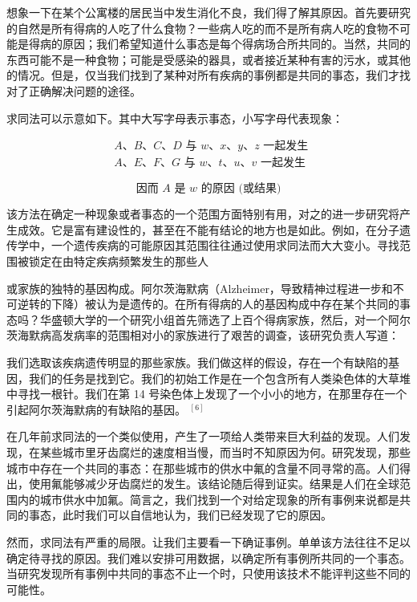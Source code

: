 想象一下在某个公寓楼的居民当中发生消化不良，我们得了解其原因。首先要研究的自然是所有得病的人吃了什么食物？一些病人吃的而不是所有病人吃的食物不可能是得病的原因；我们希望知道什么事态是每个得病场合所共同的。当然，共同的东西可能不是一种食物；可能是受感染的器具，或者接近某种有害的污水，或其他的情况。但是，仅当我们找到了某种对所有疾病的事例都是共同的事态，我们才找对了正确解决问题的途径。

求同法可以示意如下。其中大写字母表示事态，小写字母代表现象：

$$
\begin{aligned}
& A 、 B 、 C 、 D \text { 与 } w 、 x 、 y 、 z \text { 一起发生 } \\
& A 、 E 、 F 、 G \text { 与 } w 、 t 、 u 、 v \text { 一起发生 }
\end{aligned}
$$

$$
\text { 因而 } A \text { 是 } w \text { 的原因 (或结果) }
$$

该方法在确定一种现象或者事态的一个范围方面特别有用，对之的进一步研究将产生成效。它是富有建设性的，甚至在不能有结论的地方也是如此。例如，在分子遗传学中，一个遗传疾病的可能原因其范围往往通过使用求同法而大大变小。寻找范围被锁定在由特定疾病频繁发生的那些人

或家族的独特的基因构成。阿尔茨海默病（Alzheimer，导致精神过程进一步和不可逆转的下降）被认为是遗传的。在所有得病的人的基因构成中存在某个共同的事态吗？华盛顿大学的一个研究小组首先筛选了上百个得病家族，然后，对一个阿尔茨海默病高发病率的范围相对小的家族进行了艰苦的调查，该研究负责人写道：

\begin{displayquote}
我们选取该疾病遗传明显的那些家族。我们做这样的假设，存在一个有缺陷的基因，我们的任务是找到它。我们的初始工作是在一个包含所有人类染色体的大草堆中寻找一根针。我们在第 14 号染色体上发现了一个小小的地方，在那里存在一个引起阿尔茨海默病的有缺陷的基因。 ${ }^{[6]}$
\end{displayquote}

在几年前求同法的一个类似使用，产生了一项给人类带来巨大利益的发现。人们发现，在某些城市里牙齿腐烂的速度相当慢，而当时不知原因为何。研究发现，那些城市中存在一个共同的事态：在那些城市的供水中氟的含量不同寻常的高。人们得出，使用氟能够减少牙齿腐烂的发生。该结论随后得到证实。结果是人们在全球范围内的城市供水中加氟。简言之，我们找到一个对给定现象的所有事例来说都是共同的事态，此时我们可以自信地认为，我们已经发现了它的原因。

然而，求同法有严重的局限。让我们主要看一下确证事例。单单该方法往往不足以确定待寻找的原因。我们难以安排可用数据，以确定所有事例所共同的一个事态。当研究发现所有事例中共同的事态不止一个时，只使用该技术不能评判这些不同的可能性。

